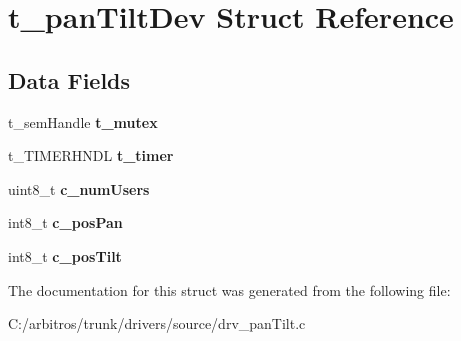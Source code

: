 \hypertarget{structt__pan_tilt_dev}{\section{t\-\_\-pan\-Tilt\-Dev Struct Reference}
\label{structt__pan_tilt_dev}
}
\subsection*{Data Fields}
\begin{DoxyCompactItemize}
\item 
\hypertarget{structt__pan_tilt_dev_a0f119a919d5e98b1d316a3b11cba4a12}{t\-\_\-sem\-Handle {\bfseries t\-\_\-mutex}}\label{structt__pan_tilt_dev_a0f119a919d5e98b1d316a3b11cba4a12}

\item 
\hypertarget{structt__pan_tilt_dev_a694b9dce840e100197a8ebdcda9b3d15}{t\-\_\-\-T\-I\-M\-E\-R\-H\-N\-D\-L {\bfseries t\-\_\-timer}}\label{structt__pan_tilt_dev_a694b9dce840e100197a8ebdcda9b3d15}

\item 
\hypertarget{structt__pan_tilt_dev_a65907c8d88006e5cdc5e6b18eb4606ba}{uint8\-\_\-t {\bfseries c\-\_\-num\-Users}}\label{structt__pan_tilt_dev_a65907c8d88006e5cdc5e6b18eb4606ba}

\item 
\hypertarget{structt__pan_tilt_dev_aca7ad6338f85ea494de0bc9c12d783e5}{int8\-\_\-t {\bfseries c\-\_\-pos\-Pan}}\label{structt__pan_tilt_dev_aca7ad6338f85ea494de0bc9c12d783e5}

\item 
\hypertarget{structt__pan_tilt_dev_a27c5fad1564328c860c00fac79e11165}{int8\-\_\-t {\bfseries c\-\_\-pos\-Tilt}}\label{structt__pan_tilt_dev_a27c5fad1564328c860c00fac79e11165}

\end{DoxyCompactItemize}


The documentation for this struct was generated from the following file\-:\begin{DoxyCompactItemize}
\item 
C\-:/arbitros/trunk/drivers/source/drv\-\_\-pan\-Tilt.\-c\end{DoxyCompactItemize}
